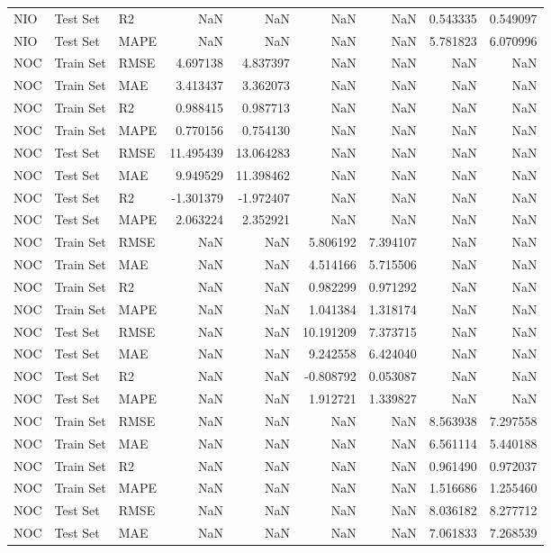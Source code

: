 \begin{tabular}{lllrrrrrr}
NIO & Test Set & R2 & NaN & NaN & NaN & NaN & 0.543335 & 0.549097 \\
NIO & Test Set & MAPE & NaN & NaN & NaN & NaN & 5.781823 & 6.070996 \\
NOC & Train Set & RMSE & 4.697138 & 4.837397 & NaN & NaN & NaN & NaN \\
NOC & Train Set & MAE & 3.413437 & 3.362073 & NaN & NaN & NaN & NaN \\
NOC & Train Set & R2 & 0.988415 & 0.987713 & NaN & NaN & NaN & NaN \\
NOC & Train Set & MAPE & 0.770156 & 0.754130 & NaN & NaN & NaN & NaN \\
NOC & Test Set & RMSE & 11.495439 & 13.064283 & NaN & NaN & NaN & NaN \\
NOC & Test Set & MAE & 9.949529 & 11.398462 & NaN & NaN & NaN & NaN \\
NOC & Test Set & R2 & -1.301379 & -1.972407 & NaN & NaN & NaN & NaN \\
NOC & Test Set & MAPE & 2.063224 & 2.352921 & NaN & NaN & NaN & NaN \\
NOC & Train Set & RMSE & NaN & NaN & 5.806192 & 7.394107 & NaN & NaN \\
NOC & Train Set & MAE & NaN & NaN & 4.514166 & 5.715506 & NaN & NaN \\
NOC & Train Set & R2 & NaN & NaN & 0.982299 & 0.971292 & NaN & NaN \\
NOC & Train Set & MAPE & NaN & NaN & 1.041384 & 1.318174 & NaN & NaN \\
NOC & Test Set & RMSE & NaN & NaN & 10.191209 & 7.373715 & NaN & NaN \\
NOC & Test Set & MAE & NaN & NaN & 9.242558 & 6.424040 & NaN & NaN \\
NOC & Test Set & R2 & NaN & NaN & -0.808792 & 0.053087 & NaN & NaN \\
NOC & Test Set & MAPE & NaN & NaN & 1.912721 & 1.339827 & NaN & NaN \\
NOC & Train Set & RMSE & NaN & NaN & NaN & NaN & 8.563938 & 7.297558 \\
NOC & Train Set & MAE & NaN & NaN & NaN & NaN & 6.561114 & 5.440188 \\
NOC & Train Set & R2 & NaN & NaN & NaN & NaN & 0.961490 & 0.972037 \\
NOC & Train Set & MAPE & NaN & NaN & NaN & NaN & 1.516686 & 1.255460 \\
NOC & Test Set & RMSE & NaN & NaN & NaN & NaN & 8.036182 & 8.277712 \\
NOC & Test Set & MAE & NaN & NaN & NaN & NaN & 7.061833 & 7.268539 \\

\end{tabular}
